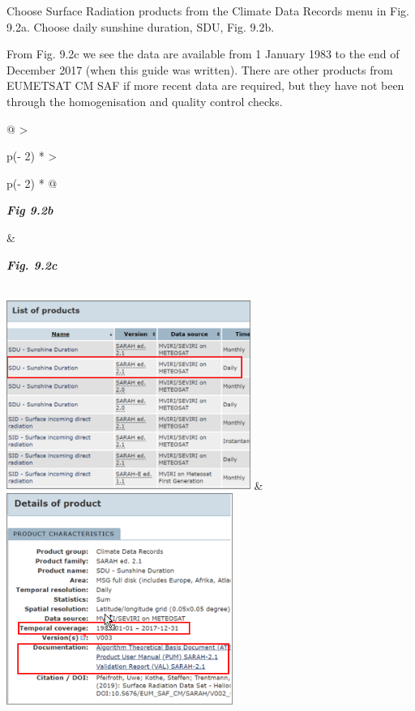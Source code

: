 \documentclass[
  letterpaper,
  DIV=11,
  numbers=noendperiod]{scrreprt}
\begin{document}
Choose Surface Radiation products from the Climate Data Records menu in
Fig. 9.2a. Choose daily sunshine duration, SDU, Fig. 9.2b.

From Fig. 9.2c we see the data are available from 1 January 1983 to the
end of December 2017 (when this guide was written). There are other
products from EUMETSAT CM SAF if more recent data are required, but they
have not been through the homogenisation and quality control checks.

\begin{longtable}[]{@{}
  >{\raggedright\arraybackslash}p{(\columnwidth - 2\tabcolsep) * }
  >{\raggedright\arraybackslash}p{(\columnwidth - 2\tabcolsep) * }@{}}
\toprule\noalign{}
\begin{minipage}[b]{\linewidth}\raggedright
\textbf{\emph{Fig 9.2b}}
\end{minipage} & \begin{minipage}[b]{\linewidth}\raggedright
\textbf{\emph{Fig. 9.2c}}
\end{minipage} \\
\midrule\noalign{}
\endhead
\bottomrule\noalign{}
\endlastfoot
\includegraphics[width=3.13347in,height=2.43495in]{figures/Fig9.2b.png}
&
\includegraphics[width=2.91179in,height=2.72179in]{figures/Fig9.2c.png} \\
\end{longtable}
\end{document}
